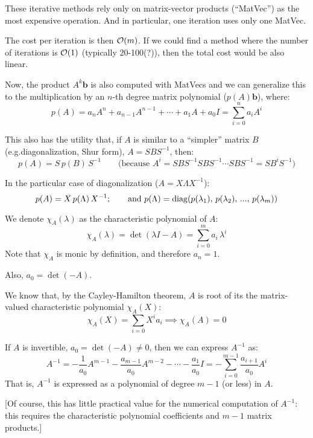 \documentclass[
  12pt,
  paper=a4,
]{scrartcl} %
\begin{document}
These iterative methods rely only on matrix-vector products (``MatVec'') as the most expensive operation. And in particular, one iteration uses only one MatVec.

The cost per iteration is then $\mathcal{O}(m)$. If we could find a method where the number of iterations is $\mathcal{O}(1)$ (typically 20-100(?)), then the total cost would be also linear.

Now, the product $A^k\bm b$ is also computed with MatVecs and we can generalize this to the multiplication by an $n$-th degree matrix polynomial ($p(A)\bm b$), where:
\[
    p(A) = a_n A^n +  a_{n-1} A^{n-1} + \cdots + a_1 A + a_0 I = \sum_{i=0}^n a_i A^i
\]

This also has the utility that, if $A$ is similar to a ``simpler''  matrix $B$ (e.g.\@ diagonalization, Shur form), $A=SBS^{-1}$, then:
\[
    p(A) = S\, p(B)\, S^{-1} \qquad \text{(because $A^{i}=SBS^{-1}SBS^{-1}\cdots SBS^{-1}=SB^{i}S^{-1}$)}
\]

In the particular case of diagonalization ($A=X\Lambda X^{-1}$):
\[
    p(A) = X\, p(\Lambda)\, X^{-1}; \qquad \text{and }p(\Lambda)
        = \operatorname{diag}(p(\lambda_1),\, p(\lambda_2),\, ...,\, p(\lambda_m))
\]


We denote $\chi_A(\lambda)$ as the characteristic polynomial of $A$:
\[\chi_A(\lambda) = \det(\lambda I - A) = \sum_{i=0}^{m}a_i\,\lambda^i \]
Note that $\chi_A$ is monic by definition, and therefore $a_n=1$.

Also, $a_0 = \det(-A)$.

We know that, by the Cayley-Hamilton theorem, $A$ is root of its the matrix-valued characteristic polynomial $\chi_A(X)$:
\[\chi_A(X) = \sum_{i=0}X^{i}a_i
    \implies
    \boxed{ \chi_A(A) = 0 }
\]

If $A$ is invertible, $a_0=\det(-A)\neq 0$, then we can express $A^{-1}$ as:
\[
    A^{-1} = -\frac{1}{a_0}A^{m-1} - \frac{a_{m-1}}{a_0}A^{m-2} - \cdots - \frac{a_1}{a_0} I
    = \boxed{-\sum_{i=0}^{m-1} \frac{a_{i+1}}{a_0} A^{i}}
\]
That is, $A^{-1}$ is expressed as a polynomial of degree $m-1$ (or less) in $A$.

[Of course, this has little practical value for the numerical computation of $A^{-1}$: this requires the characteristic polynomial coefficients and $m-1$ matrix products.]
\end{document}

